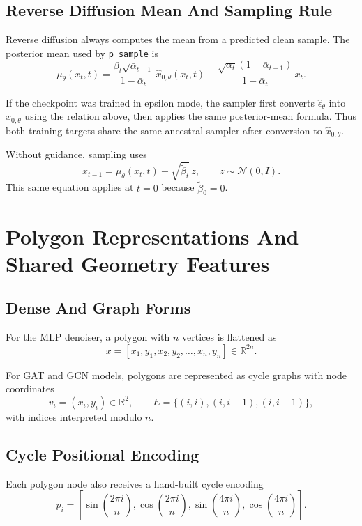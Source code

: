 \documentclass[11pt]{article}
\newcommand{\R}{\mathbb{R}}
\begin{document}
\subsection{Reverse Diffusion Mean And Sampling Rule}
Reverse diffusion always computes the mean from a predicted clean sample. The posterior mean used by \texttt{p\_sample} is
\begin{equation}
\mu_\theta(x_t,t)
=
\frac{\beta_t \sqrt{\bar{\alpha}_{t-1}}}{1-\bar{\alpha}_t}\,\hat{x}_{0,\theta}(x_t,t)
+
\frac{\sqrt{\alpha_t}(1-\bar{\alpha}_{t-1})}{1-\bar{\alpha}_t}\,x_t.
\end{equation}

If the checkpoint was trained in epsilon mode, the sampler first converts $\hat{\epsilon}_\theta$ into $\hat{x}_{0,\theta}$ using the relation above, then applies the same posterior-mean formula. Thus both training targets share the same ancestral sampler after conversion to $\hat{x}_{0,\theta}$.

Without guidance, sampling uses
\begin{equation}
x_{t-1}
=
\mu_\theta(x_t,t) + \sqrt{\tilde{\beta}_t}\,z,
\qquad z \sim \mathcal{N}(0,I).
\end{equation}
This same equation applies at $t=0$ because $\tilde{\beta}_0 = 0$.

\section{Polygon Representations And Shared Geometry Features}
\subsection{Dense And Graph Forms}
For the MLP denoiser, a polygon with $n$ vertices is flattened as
\begin{equation}
x = [x_1, y_1, x_2, y_2, \dots, x_n, y_n] \in \R^{2n}.
\end{equation}

For GAT and GCN models, polygons are represented as cycle graphs with node coordinates
\begin{equation}
v_i = (x_i, y_i) \in \R^2,
\qquad
E = \{(i,i), (i,i+1), (i,i-1)\},
\end{equation}
with indices interpreted modulo $n$.

\subsection{Cycle Positional Encoding}
Each polygon node also receives a hand-built cycle encoding
\begin{equation}
p_i =
\left[
\sin\!\left(\frac{2\pi i}{n}\right),
\cos\!\left(\frac{2\pi i}{n}\right),
\sin\!\left(\frac{4\pi i}{n}\right),
\cos\!\left(\frac{4\pi i}{n}\right)
\right].
\end{equation}
\end{document}
